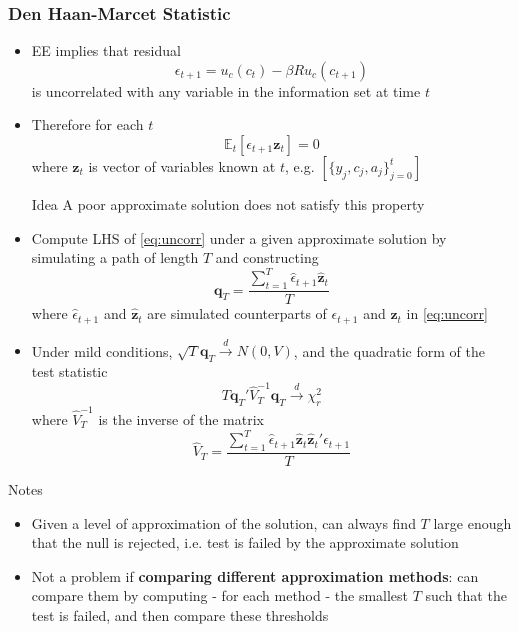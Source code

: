 \documentclass{beamer}
\begin{document}
\begin{frame}
  \frametitle{Den Haan-Marcet Statistic}
  \begin{itemize}
    \item EE implies that residual
    \begin{equation*}
      \epsilon_{t+1} = u_c(c_t) - \beta R u_c(c_{t+1})
    \end{equation*}
    is uncorrelated with any variable in the information set at time $t$
    \item Therefore for each $t$
    \begin{equation}\label{eq:uncorr}
      \mathbb{E}_t[\epsilon_{t+1} \mathbf{z}_t]=0
    \end{equation}
    where $\mathbf{z}_t$ is vector of variables known at $t$, e.g. $[\{y_j, c_j, a_j\}_{j=0}^{t}]$
    \begin{block}{Idea}
      A poor approximate solution does not satisfy this property
    \end{block}
    \item Compute LHS of \ref{eq:uncorr} under a given approximate solution by simulating a path of length $T$ and constructing
    \begin{equation*}
      \mathbf{q}_T = \frac{\sum_{t=1}^T \hat{\epsilon}_{t+1}\hat{\mathbf{z}}_t}{T}
    \end{equation*}
    where $\hat{\epsilon}_{t+1}$ and $\hat{\mathbf{z}}_t$ are simulated counterparts of $\epsilon_{t+1}$ and $\mathbf{z}_t$ in \ref{eq:uncorr}
    \end{itemize}
\end{frame}

\begin{frame}
  \begin{itemize}
    \item Under mild conditions, $\sqrt{T}\mathbf{q}_T\xrightarrow{d}N(0,V)$, and the quadratic form of the test statistic
    \begin{equation*}
      T\mathbf{q}_T'\hat{V}_T^{-1}\mathbf{q}_T\xrightarrow{d}\chi^2_r
    \end{equation*}
    where $\hat{V}_T^{-1}$ is the inverse of the matrix
    \begin{equation*}
      \hat{V}_T = \frac{\sum_{t=1}^T \hat{\epsilon}_{t+1}\hat{\mathbf{z}}_t\hat{\mathbf{z}}_t'\hat{\epsilon}_{t+1}}{T}
    \end{equation*}
  \end{itemize}
  \begin{block}{Notes}
    \begin{itemize}
      \item Given a level of approximation of the solution, can always find $T$ large enough that the null is rejected, i.e. test is failed by the approximate solution
      \item Not a problem if \textbf{comparing different approximation methods}: can compare them by computing - for each method - the smallest $T$ such that the test is failed, and then compare these thresholds
  \end{itemize}
  \end{block}
\end{frame}
\end{document}
